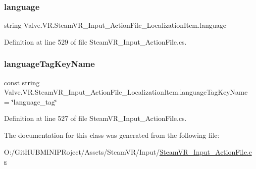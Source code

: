 \subsubsection{\texorpdfstring{language}{language}}
{\footnotesize\ttfamily string Valve.\+V\+R.\+Steam\+V\+R\+\_\+\+Input\+\_\+\+Action\+File\+\_\+\+Localization\+Item.\+language}



Definition at line 529 of file Steam\+V\+R\+\_\+\+Input\+\_\+\+Action\+File.\+cs.

\mbox{\label{class_valve_1_1_v_r_1_1_steam_v_r___input___action_file___localization_item_af72f594ddd05655587eaa0691eeb66b0}} 
\subsubsection{\texorpdfstring{languageTagKeyName}{languageTagKeyName}}
{\footnotesize\ttfamily const string Valve.\+V\+R.\+Steam\+V\+R\+\_\+\+Input\+\_\+\+Action\+File\+\_\+\+Localization\+Item.\+language\+Tag\+Key\+Name = \char`\"{}language\+\_\+tag\char`\"{}}



Definition at line 527 of file Steam\+V\+R\+\_\+\+Input\+\_\+\+Action\+File.\+cs.



The documentation for this class was generated from the following file\+:\begin{DoxyCompactItemize}
\item 
O\+:/\+Git\+H\+U\+B\+M\+I\+N\+I\+P\+Roject/\+Assets/\+Steam\+V\+R/\+Input/\mbox{\hyperlink{_steam_v_r___input___action_file_8cs}{Steam\+V\+R\+\_\+\+Input\+\_\+\+Action\+File.\+cs}}\end{DoxyCompactItemize}

